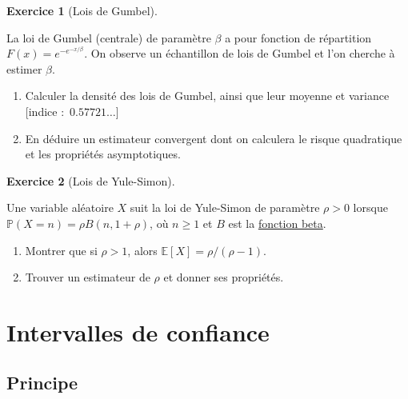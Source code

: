 \documentclass[
  10,
  letterpaper,
  DIV=11,
  numbers=noendperiod]{scrreport}
\providecommand{\tightlist}{%
  \setlength{\itemsep}{0pt}\setlength{\parskip}{0pt}}\usepackage{longtable,booktabs,array}
\theoremstyle{plain}
\theoremstyle{definition}
\newtheorem{exercise}{Exercice}[chapter]
\theoremstyle{plain}
\theoremstyle{definition}
\theoremstyle{definition}
\theoremstyle{plain}
\theoremstyle{remark}
\begin{document}
\begin{exercise}[Lois de
Gumbel]\protect\hypertarget{exr-gumbel}{}\label{exr-gumbel}

La loi de Gumbel (centrale) de paramètre \(\beta\) a pour fonction de
répartition \(F(x)= e^{-e^{-x/\beta}}\). On observe un échantillon de
lois de Gumbel et l'on cherche à estimer \(\beta\).

\begin{enumerate}
\def\labelenumi{\arabic{enumi}.}
\tightlist
\item
  Calculer la densité des lois de Gumbel, ainsi que leur moyenne et
  variance {[}indice :~\(0.57721…\){]}
\item
  En déduire un estimateur convergent dont on calculera le risque
  quadratique et les propriétés asymptotiques.
\end{enumerate}

\end{exercise}

\begin{exercise}[Lois de
Yule-Simon]\protect\hypertarget{exr-yule}{}\label{exr-yule}

Une variable aléatoire \(X\) suit la loi de Yule-Simon de paramètre
\(\rho>0\) lorsque \(\mathbb{P}(X = n) = \rho B(n, 1+\rho)\), où
\(n\geqslant 1\) et \(B\) est la
\href{https://en.wikipedia.org/wiki/Beta_function}{fonction beta}.

\begin{enumerate}
\def\labelenumi{\arabic{enumi}.}
\tightlist
\item
  Montrer que si \(\rho>1\), alors \(\mathbb{E}[X] = \rho/(\rho-1)\).
\item
  Trouver un estimateur de \(\rho\) et donner ses propriétés.
\end{enumerate}

\end{exercise}


\hypertarget{intervalles-de-confiance}{%
\chapter{Intervalles de confiance}\label{intervalles-de-confiance}}

\hypertarget{principe}{%
\section{Principe}\label{principe}}
\end{document}
